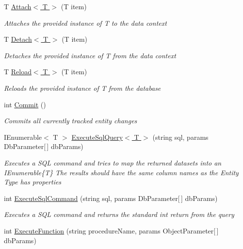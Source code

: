 \begin{DoxyCompactItemize}
T \hyperlink{class_highway_1_1_data_1_1_data_context_a5fdc0f2a2966b7b39086410020d002ae}{Attach$<$ T $>$} (T item)
\begin{DoxyCompactList}\small\item\em Attaches the provided instance of {\itshape T}  to the data context \end{DoxyCompactList}\item 
T \hyperlink{class_highway_1_1_data_1_1_data_context_a59a714f1f0c316e54c6bda401155b947}{Detach$<$ T $>$} (T item)
\begin{DoxyCompactList}\small\item\em Detaches the provided instance of {\itshape T}  from the data context \end{DoxyCompactList}\item 
T \hyperlink{class_highway_1_1_data_1_1_data_context_a356e8fd459774943527943f1cfeb4f46}{Reload$<$ T $>$} (T item)
\begin{DoxyCompactList}\small\item\em Reloads the provided instance of {\itshape T}  from the database \end{DoxyCompactList}\item 
int \hyperlink{class_highway_1_1_data_1_1_data_context_a9ce97e92d86b82aa7f31a5d59f98e817}{Commit} ()
\begin{DoxyCompactList}\small\item\em Commits all currently tracked entity changes \end{DoxyCompactList}\item 
I\-Enumerable$<$ T $>$ \hyperlink{class_highway_1_1_data_1_1_data_context_a39afcba0bd8847a3077883a832fc360e}{Execute\-Sql\-Query$<$ T $>$} (string sql, params Db\-Parameter\mbox{[}$\,$\mbox{]} db\-Params)
\begin{DoxyCompactList}\small\item\em Executes a S\-Q\-L command and tries to map the returned datasets into an I\-Enumerable\{\-T\} The results should have the same column names as the Entity Type has properties \end{DoxyCompactList}\item 
int \hyperlink{class_highway_1_1_data_1_1_data_context_a53be0d1815f1e1f7edfc4132295827ca}{Execute\-Sql\-Command} (string sql, params Db\-Parameter\mbox{[}$\,$\mbox{]} db\-Params)
\begin{DoxyCompactList}\small\item\em Executes a S\-Q\-L command and returns the standard int return from the query \end{DoxyCompactList}\item 
int \hyperlink{class_highway_1_1_data_1_1_data_context_a2efb49e3b623dbfbcdd3e8bd258e3d87}{Execute\-Function} (string procedure\-Name, params Object\-Parameter\mbox{[}$\,$\mbox{]} db\-Params)
\begin{DoxyCompactList}\small\item\em \end{DoxyCompactList}\end{DoxyCompactItemize}
